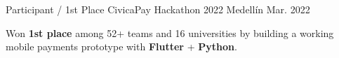 
\begin{cventries}
  \cventry
  {Participant / 1st Place}
  {CivicaPay Hackathon 2022}
  {Medellín}
  {Mar. 2022}
  {
    \begin{cvitems}
      \item {Won \textbf{1st place} among 52+ teams and 16 universities by building a working mobile payments prototype with \textbf{Flutter} + \textbf{Python}.}
    \end{cvitems}
  }
\end{cventries}
